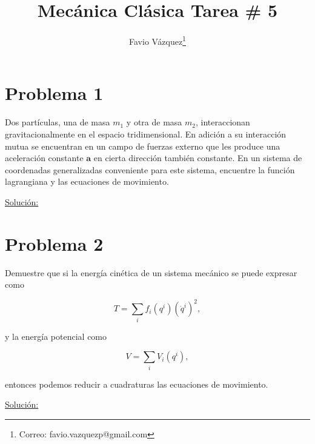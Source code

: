 \documentclass[a4paper,10pt]{article}
\title{Mecánica Clásica Tarea \# 5}
\author{Favio Vázquez\thanks{Correo: favio.vazquezp@gmail.com}}\affil{Instituto de Ciencias Nucleares. Universidad Nacional Autónoma de México.}
\date{}
\numberwithin{equation}{section}
\begin{document}
\makeatletter
\def\@maketitle{%
  \newpage
  \null
  \vskip 2em%
  \begin{center}%
  \let \footnote \thanks
    {\Large\bfseries \@title \par}%
    \vskip 1.5em%
    {\normalsize
      \lineskip .5em%
      \begin{tabular}[t]{c}%
        \@author
      \end{tabular}\par}%
    \vskip 1em%
    {\normalsize \@date}%
  \end{center}%
  \par
  \vskip 1.5em}
\makeatother

\maketitle

\section{Problema 1}

Dos partículas, una de masa $m_1$ y otra de masa $m_2$, interaccionan gravitacionalmente 
en el espacio tridimensional. En adición a su interacción mutua se encuentran en un campo 
de fuerzas externo que les produce una aceleración constante $\mathbf{a}$ en cierta 
dirección también constante. En un sistema de coordenadas generalizadas conveniente para este 
sistema, encuentre la función lagrangiana y las ecuaciones de movimiento.

\vspace{.3cm}

\underline{Solución:} \vspace{.3cm}

\section{Problema 2}

Demuestre que si la energía cinética de un sistema mecánico se puede expresar como

$$
T = \sum_i f_i(q^i)(\dot{q}^i)^2,
$$

y la energía potencial como

$$
V = \sum_i V_i(q^i),
$$

entonces podemos reducir a cuadraturas las ecuaciones de movimiento.

\vspace{.3cm}

\underline{Solución:} \vspace{.3cm}
\end{document}
